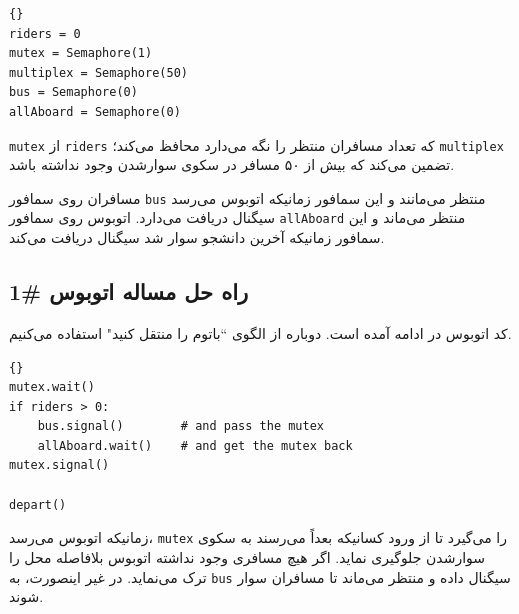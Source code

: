 \documentclass{book}
\newcommand{\clearemptydoublepage}{\newpage\cleardoublepage}
\begin{document}
\begin{latin}
\begin{lstlisting}[title=\rl{راهنمای مساله اتوبوس}]{}
riders = 0
mutex = Semaphore(1)
multiplex = Semaphore(50)
bus = Semaphore(0)
allAboard = Semaphore(0)
\end{lstlisting}
\end{latin}

    {\tt mutex}
    از  {\tt riders} که تعداد مسافران منتظر را نگه می‌دارد محافظ می‌کند؛ {\tt multiplex} تضمین می‌کند که بیش از ۵۰ مسافر در 
    سکوی  سوارشدن وجود نداشته باشد. 
    

    مسافران روی سمافور {\tt bus} منتظر می‌مانند و این سمافور زمانیکه اتوبوس می‌رسد سیگنال دریافت می‌دارد. 
    اتوبوس روی سمافور {\tt allAboard} منتظر می‌ماند و این سمافور زمانیکه آخرین دانشجو سوار شد سیگنال دریافت می‌کند. 


\clearemptydoublepage
\subsection {راه حل مساله اتوبوس \#1}

    کد اتوبوس در ادامه آمده است. دوباره از الگوی ``باتوم را منتقل کنید" استفاده می‌کنیم. 

\begin{latin}
\begin{lstlisting}[title=\rl{راه حل مساله اتوبوس (اتوبوس)}]{}
mutex.wait()
if riders > 0:
    bus.signal()        # and pass the mutex
    allAboard.wait()    # and get the mutex back
mutex.signal()

depart()
\end{lstlisting}
\end{latin}

    زمانیکه اتوبوس می‌رسد، {\tt mutex} را می‌گیرد تا از ورود کسانیکه بعداً می‌رسند به سکوی سوارشدن جلوگیری نماید.
    اگر هیچ مسافری وجود نداشته اتوبوس بلافاصله محل را ترک می‌نماید. در غیر اینصورت، به {\tt bus} سیگنال داده و 
    منتظر می‌ماند تا مسافران سوار شوند. 
\end{document}
